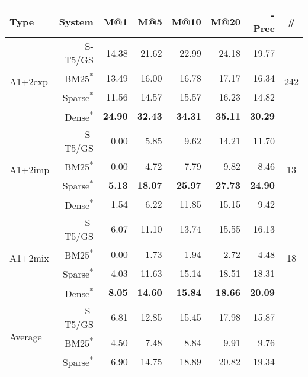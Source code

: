 \documentclass[11pt]{article}
\begin{document}
\begin{table*}[]
    \centering
    \begin{tabular}{l|r|r|r|r|r|r|c}
       Type &  System &  M@1 &  M@5 &  M@10 &  M@20 &  -Prec &  \# \\
    \hline
    \hline
    \multirow{4}{4em}{A1+2exp} &    S-T5/GS &  14.38 &  21.62 &   22.99 &   24.18 &        19.77 &      \multirow{4}{2em}{242} \\
     &    BM25\textsuperscript{*} &  13.49 &  16.00 &   16.78 &   17.17 &        16.34 &       \\
     &    Sparse\textsuperscript{*} &  11.56 &  14.57 &   15.57 &   16.23 &        14.82 &       \\
     &    Dense\textsuperscript{*} &  \textbf{24.90} &  \textbf{32.43} &   \textbf{34.31} &   \textbf{35.11} &        \textbf{30.29} &       \\
    \hline
    \multirow{4}{4em}{A1+2imp} &    S-T5/GS &   0.00 &   5.85 &    9.62 &   14.21 &        11.70 &       \multirow{4}{2em}{13} \\
     &    BM25\textsuperscript{*} &   0.00 &   4.72 &    7.79 &    9.82 &         8.46 &        \\
     &    Sparse\textsuperscript{*} &   \textbf{5.13} &  \textbf{18.07} &   \textbf{25.97} &   \textbf{27.73} &        \textbf{24.90} &        \\
     &    Dense\textsuperscript{*} &   1.54 &   6.22 &   11.85 &   15.15 &         9.42 &        \\
    \hline
    \multirow{4}{4em}{A1+2mix} &    S-T5/GS &   6.07 &  11.10 &   13.74 &   15.55 &        16.13 &       \multirow{4}{2em}{18} \\
     &    BM25\textsuperscript{*} &   0.00 &   1.73 &    1.94 &    2.72 &         4.48 &        \\
     &    Sparse\textsuperscript{*} &   4.03 &  11.63 &   15.14 &   18.51 &        18.31 &        \\
     &    Dense\textsuperscript{*} &   \textbf{8.05} &  \textbf{14.60} &   \textbf{15.84} &   \textbf{18.66} &        \textbf{20.09} &        \\
    \hline
    \hline
       \multirow{4}{4em}{Average} &    S-T5/GS &   6.81 &  12.85 &   15.45 &   17.98 &        15.87 &        \\
        &    BM25\textsuperscript{*} &   4.50 &   7.48 &    8.84 &    9.91 &         9.76 &         \\
        &    Sparse\textsuperscript{*} &   6.90 &  14.75 &   18.89 &   20.82 &        19.34 &        \\

\end{tabular}
\end{table*}
\end{document}
